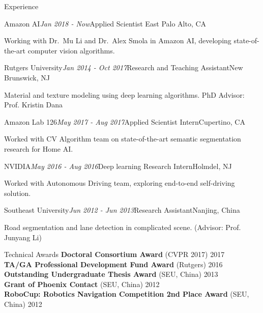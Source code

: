 \documentclass{resume} %
\begin{document}
\begin{rSection}{Experience}

\begin{rSubsection}{Amazon AI}{\em Jan 2018 - Now}{Applied Scientist  }{East Palo Alto, CA}
\item Working with Dr.~Mu Li and Dr.~Alex Smola in Amazon AI, developing state-of-the-art computer vision algorithms.
\end{rSubsection}

\begin{rSubsection}{Rutgers University}{\em Jan 2014 - Oct 2017}{Research and Teaching Assistant}{New Brunswick, NJ}
\item Material and texture modeling using deep learning algorithms. PhD Advisor: Prof. Kristin Dana
\end{rSubsection}

\begin{rSubsection}{Amazon Lab 126}{\em May 2017 - Aug 2017}{Applied Scientist Intern}{Cupertino, CA}
\item Worked with CV Algorithm team on state-of-the-art semantic segmentation research for Home AI. 
\end{rSubsection}

\begin{rSubsection}{NVIDIA}{\em May 2016 - Aug 2016}{Deep learning Research Intern}{Holmdel, NJ}
\item Worked with Autonomous Driving team, exploring end-to-end self-driving solution. 
\end{rSubsection}

\begin{rSubsection}{Southeast University}{\em Jun 2012 - Jun 2013}{Research Assistant}{Nanjing, China}
\item %
Road segmentation and lane detection in complicated scene. (Advisor: Prof. Junyang Li)
\end{rSubsection}

\end{rSection}


\begin{rSection}{Technical Awards}
{\bf Doctoral Consortium Award} (CVPR 2017) \hfill {2017} \\
{\bf TA/GA Professional Development Fund Award} (Rutgers) \hfill {2016}\\ 
{\bf Outstanding Undergraduate Thesis Award} (SEU, China) \hfill {2013}\\
{\bf Grant of Phoenix Contact} (SEU, China) \hfill {2012} \\
{\bf RoboCup: Robotics Navigation Competition 2nd Place Award} (SEU, China) \hfill {2012}

\end{rSection}
\end{document}
